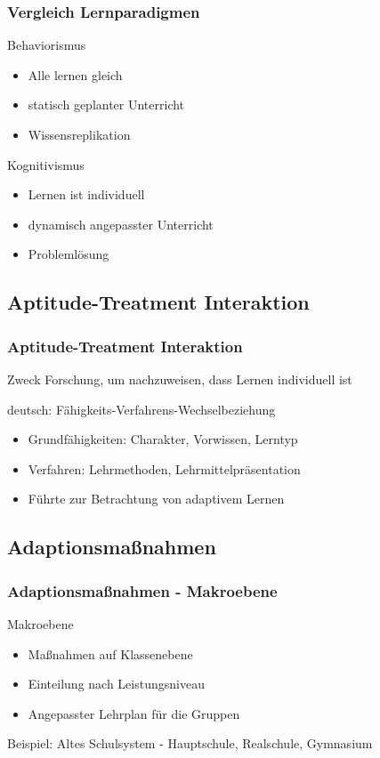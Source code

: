 \documentclass{beamer}
\begin{document}
  \begin{frame}
  \frametitle{Vergleich Lernparadigmen}
    \begin{alertblock}{Behaviorismus}
     \begin{itemize}
       \item Alle lernen gleich
       \item statisch geplanter Unterricht
       \item Wissensreplikation
     \end{itemize}
    \end{alertblock}

    \begin{block}{Kognitivismus}
     \begin{itemize}
       \item Lernen ist individuell
       \item dynamisch angepasster Unterricht
       \item Problemlösung
     \end{itemize}
    \end{block}
  \end{frame}
\subsection{Aptitude-Treatment Interaktion}
\begin{frame}
  \frametitle{Aptitude-Treatment Interaktion}

  \begin{block}{Zweck}
    Forschung, um nachzuweisen, dass Lernen individuell ist
  \end{block}

  \begin{block}{deutsch:}
    Fähigkeits-Verfahrens-Wechselbeziehung
  \end{block}

  \begin{itemize}
    \item Grundfähigkeiten: Charakter, Vorwissen, Lerntyp
    \item Verfahren: Lehrmethoden, Lehrmittelpräsentation
    \item Führte zur Betrachtung von adaptivem Lernen
  \end{itemize}
\end{frame}
\subsection{Adaptionsmaßnahmen}
\begin{frame}
  \frametitle{Adaptionsmaßnahmen - Makroebene}
  \begin{block}{Makroebene}
    \begin{itemize}
      \item Maßnahmen auf Klassenebene
      \item Einteilung nach Leistungsniveau
      \item Angepasster Lehrplan für die Gruppen
    \end{itemize}
  \end{block}

  Beispiel: Altes Schulsystem - Hauptschule, Realschule, Gymnasium
\end{frame}
\end{document}
